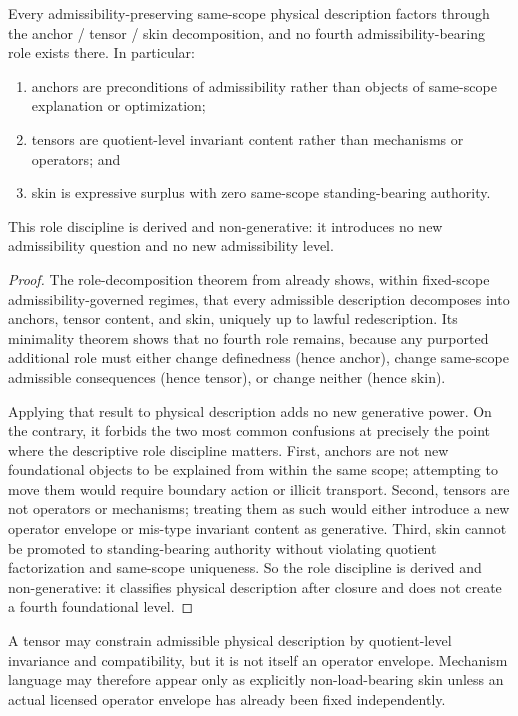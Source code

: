 \begin{theorem}
\label{thm:ats-physical}
Every admissibility-preserving same-scope physical description factors through the anchor / tensor / skin decomposition, and no fourth admissibility-bearing role exists there. In particular:
\begin{enumerate}
  \item anchors are preconditions of admissibility rather than objects of same-scope explanation or optimization;
  \item tensors are quotient-level invariant content rather than mechanisms or operators; and
  \item skin is expressive surplus with zero same-scope standing-bearing authority.
\end{enumerate}
This role discipline is derived and non-generative: it introduces no new admissibility question and no new admissibility level.
\end{theorem}

\begin{proof}
The role-decomposition theorem from \atsdoc{} already shows, within fixed-scope admissibility-governed regimes, that every admissible description decomposes into anchors, tensor content, and skin, uniquely up to lawful redescription. Its minimality theorem shows that no fourth role remains, because any purported additional role must either change definedness (hence anchor), change same-scope admissible consequences (hence tensor), or change neither (hence skin).

Applying that result to physical description adds no new generative power. On the contrary, it forbids the two most common confusions at precisely the point where the descriptive role discipline matters. First, anchors are not new foundational objects to be explained from within the same scope; attempting to move them would require boundary action or illicit transport. Second, tensors are not operators or mechanisms; treating them as such would either introduce a new operator envelope or mis-type invariant content as generative. Third, skin cannot be promoted to standing-bearing authority without violating quotient factorization and same-scope uniqueness. So the role discipline is derived and non-generative: it classifies physical description after closure and does not create a fourth foundational level.
\end{proof}

\begin{corollary}
A tensor may constrain admissible physical description by quotient-level invariance and compatibility, but it is not itself an operator envelope. Mechanism language may therefore appear only as explicitly non-load-bearing skin unless an actual licensed operator envelope has already been fixed independently.
\end{corollary}


